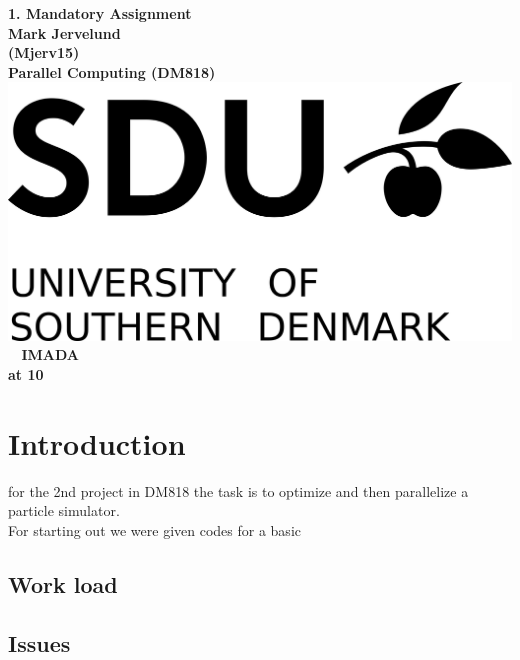\documentclass[a4paper,10pt,titlepage]{report}
\date{}
\begin{document}
\begin{titlepage}
\centering
    \vspace*{9\baselineskip}
    \huge
    \bfseries
    1. Mandatory Assignment \\
    \normalfont
    Mark Jervelund  \\
    (Mjerv15) \\
	\huge
    Parallel Computing (DM818)  \\[4\baselineskip]
    \normalfont
	\includegraphics[scale=1]{SDU_logo}
    \vfill\
    \vspace{5mm}
    IMADA \\

    \textbf{\datedate}  \bf{at 10} \\[2\baselineskip]
\end{titlepage}

\renewcommand{\thepage}{\roman{page}}%
\tableofcontents
\newpage
\setcounter{page}{1}
\renewcommand{\thepage}{\arabic{page}}


\section{Introduction}

for the 2nd project in DM818 the task is to optimize and then parallelize a particle simulator.\\ For starting out we were given codes for a basic


\subsection{Work load}


\subsection{Issues}
\end{document}
